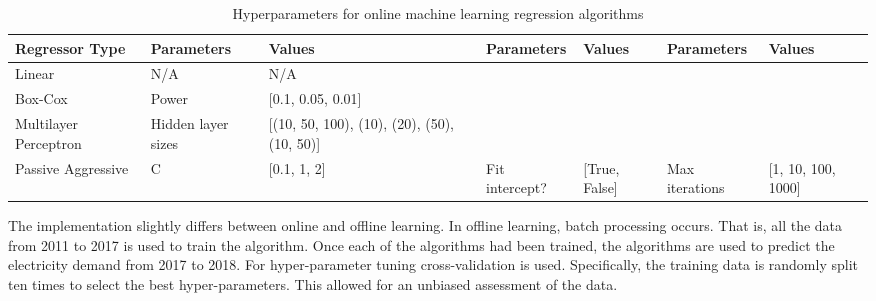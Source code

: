 \documentclass[final,3p,times,twocolumn,numbers]{elsarticle}
\begin{document}
\begin{table}
\centering
\begin{tabular}{@{}llp{3cm}lllp{1.6cm}@{}}
\toprule
\textbf{Regressor Type} & \textbf{Parameters} & \textbf{Values}                                  & \textbf{Parameters} & \textbf{Values}   & \textbf{Parameters} & \textbf{Values}        \\ \midrule
Linear                  & N/A                 & N/A                                              &                     &                   &                     &                        \\
Box-Cox                 & Power               & {[}0.1, 0.05, 0.01{]}                            &                     &                   &                     &                        \\
Multilayer Perceptron   & Hidden layer sizes  & {[}(10, 50, 100), (10),  (20), (50), (10, 50){]} & 
                    &                   &                     &                        \\ 
                    Passive Aggressive      & C                   & {[}0.1, 1, 2{]}                                  & Fit intercept?      & {[}True, False{]} & Max iterations      & {[}1, 10, 100, 1000{]} \\
\bottomrule
\end{tabular}%
\caption{Hyperparameters for online machine learning regression algorithms}
\label{table:hyperparameter-tuning-online}
\end{table}%

 The implementation slightly differs between online and offline learning. In offline learning, batch processing occurs. That is, all the data from 2011 to 2017 is used to train the algorithm. Once each of the algorithms had been trained, the algorithms are used to predict the electricity demand from 2017 to 2018. For hyper-parameter tuning cross-validation is used. Specifically, the training data is randomly split ten times to select the best hyper-parameters. This allowed for an unbiased assessment of the data.  
\end{document}
